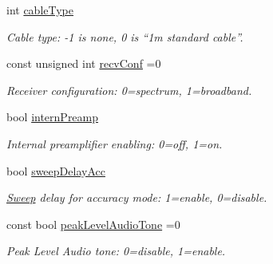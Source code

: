 \begin{DoxyCompactItemize}
int \hyperlink{structSpectranConfigurator_1_1FixedParameters_af1eeef76fb85a2ccf937f3dd949d9980}{cable\+Type}
\begin{DoxyCompactList}\small\item\em Cable type\+: -\/1 is none, 0 is “1m standard cable”. \end{DoxyCompactList}\item 
\mbox{\label{structSpectranConfigurator_1_1FixedParameters_a212370cc31cf311edf1ce71ca01f4b91}} 
const unsigned int \hyperlink{structSpectranConfigurator_1_1FixedParameters_a212370cc31cf311edf1ce71ca01f4b91}{recv\+Conf} =0
\begin{DoxyCompactList}\small\item\em Receiver configuration\+: 0=spectrum, 1=broadband. \end{DoxyCompactList}\item 
\mbox{\label{structSpectranConfigurator_1_1FixedParameters_aa86943c70f5c03d87fb78c05af17ac28}} 
bool \hyperlink{structSpectranConfigurator_1_1FixedParameters_aa86943c70f5c03d87fb78c05af17ac28}{intern\+Preamp}
\begin{DoxyCompactList}\small\item\em Internal preamplifier enabling\+: 0=off, 1=on. \end{DoxyCompactList}\item 
\mbox{\label{structSpectranConfigurator_1_1FixedParameters_ad835d567560a9fb3bf1f9469955c2363}} 
bool \hyperlink{structSpectranConfigurator_1_1FixedParameters_ad835d567560a9fb3bf1f9469955c2363}{sweep\+Delay\+Acc}
\begin{DoxyCompactList}\small\item\em \hyperlink{structSweep}{Sweep} delay for accuracy mode\+: 1=enable, 0=disable. \end{DoxyCompactList}\item 
\mbox{\label{structSpectranConfigurator_1_1FixedParameters_a5d0c325f17d9e3efce429b187c833911}} 
const bool \hyperlink{structSpectranConfigurator_1_1FixedParameters_a5d0c325f17d9e3efce429b187c833911}{peak\+Level\+Audio\+Tone} =0
\begin{DoxyCompactList}\small\item\em Peak Level Audio tone\+: 0=disable, 1=enable. \end{DoxyCompactList}\item 

\end{DoxyCompactItemize}
